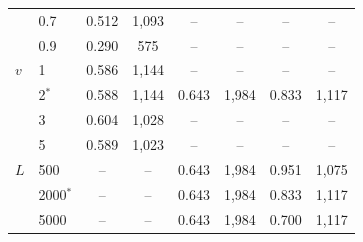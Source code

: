 \begin{tabular}{@{}llcccccc@{}}
 & 0.7 & 0.512 & 1,093 & -- & -- & -- & -- \\
 & 0.9 & 0.290 & 575 & -- & -- & -- & -- \\
\addlinespace[2pt]
$v$ & 1 & 0.586 & 1,144 & -- & -- & -- & -- \\
 & 2$^\ast$ & 0.588 & 1,144 & 0.643 & 1,984 & 0.833 & 1,117 \\
 & 3 & 0.604 & 1,028 & -- & -- & -- & -- \\
 & 5 & 0.589 & 1,023 & -- & -- & -- & -- \\
\addlinespace[2pt]
$L$ & 500 & -- & -- & 0.643 & 1,984 & 0.951 & 1,075 \\
 & 2000$^\ast$ & -- & -- & 0.643 & 1,984 & 0.833 & 1,117 \\
 & 5000 & -- & -- & 0.643 & 1,984 & 0.700 & 1,117 \\
\bottomrule
\end{tabular}